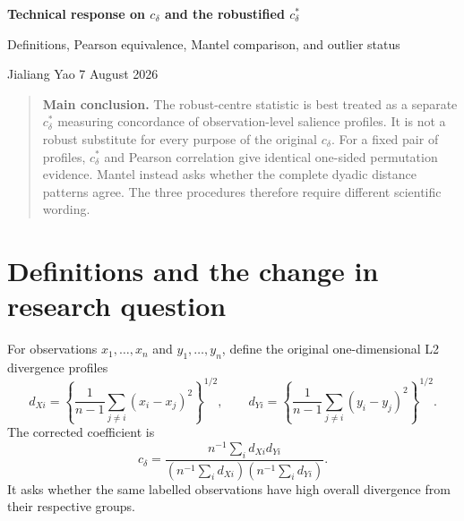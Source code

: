 
\providecommand{\cd}{c_\delta}
\providecommand{\cds}{c_\delta^\ast}

\begin{center}
{\LARGE\bfseries Technical response on $c_\delta$ and the robustified $c_\delta^\ast$}\par
\vspace{0.4em}
{\large Definitions, Pearson equivalence, Mantel comparison, and outlier status}\par
\vspace{0.6em}
Jialiang Yao \hfill 7 August 2026
\end{center}

\vspace{0.5em}
\begin{quote}
\textbf{Main conclusion.} The robust-centre statistic is best treated as a
separate $\cds$ measuring concordance of observation-level salience profiles.
It is not a robust substitute for every purpose of the original $\cd$.
For a fixed pair of profiles, $\cds$ and Pearson correlation give identical
one-sided permutation evidence. Mantel instead asks whether the complete
dyadic distance patterns agree. The three procedures therefore require
different scientific wording.
\end{quote}

\section{Definitions and the change in research question}

For observations $x_1,\ldots,x_n$ and $y_1,\ldots,y_n$, define the original
one-dimensional L2 divergence profiles
\begin{equation}
d_{Xi}=\left\{\frac{1}{n-1}\sum_{j\ne i}(x_i-x_j)^2\right\}^{1/2},
\qquad
d_{Yi}=\left\{\frac{1}{n-1}\sum_{j\ne i}(y_i-y_j)^2\right\}^{1/2}.
\end{equation}
The corrected coefficient is
\begin{equation}
\cd=\frac{n^{-1}\sum_i d_{Xi}d_{Yi}}
{(n^{-1}\sum_i d_{Xi})(n^{-1}\sum_i d_{Yi})}.
\end{equation}
It asks whether the same labelled observations have high overall divergence
from their respective groups.

